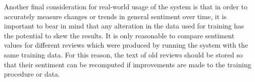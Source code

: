 \documentclass[11pt]{article}
\begin{document}
Another final consideration for real-world usage of the system is that in order
to accurately measure changes or trends in general sentiment over time, it is
important to bear in mind that any alteration in the data used for training has
the potential to skew the results. It is only reasonable to compare sentiment
values for different reviews which were produced by running the system with the
same training data. For this reason, the text of old reviews should be stored
so that their sentiment can be recomputed if improvements are made to the
training procedure or data.

{}

\end{document}
